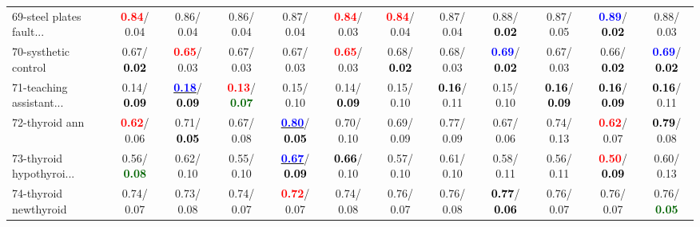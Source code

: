 \begin{table}[h]
\begin{center}
{\begin{tabular}{lc|c|c|c|c|c|c|c|c|c|c}
69-steel plates fault... & \textcolor{red}{\textbf{  0.84}}/  0.04 &   0.86/  0.04 &   0.86/  0.04 &   0.87/  0.04 & \textcolor{red}{\textbf{  0.84}}/  0.03 & \textcolor{red}{\textbf{  0.84}}/  0.04 &   0.87/  0.04 &   0.88/\textcolor{black}{\textbf{  0.02}} &   0.87/  0.05 & \textcolor{blue}{\textbf{  0.89}}/\textcolor{black}{\textbf{  0.02}} &   0.88/  0.03 \\
70-systhetic control &   0.67/\textcolor{black}{\textbf{  0.02}} & \textcolor{red}{\textbf{  0.65}}/  0.03 &   0.67/  0.03 &   0.67/  0.03 & \textcolor{red}{\textbf{  0.65}}/  0.03 &   0.68/\textcolor{black}{\textbf{  0.02}} &   0.68/  0.03 & \textcolor{blue}{\textbf{  0.69}}/\textcolor{black}{\textbf{  0.02}} &   0.67/  0.03 &   0.66/\textcolor{black}{\textbf{  0.02}} & \textcolor{blue}{\textbf{  0.69}}/\textcolor{black}{\textbf{  0.02}} \\
71-teaching assistant... &   0.14/\textcolor{black}{\textbf{  0.09}} & \underline{\textcolor{blue}{\textbf{  0.18}}}/\textcolor{black}{\textbf{  0.09}} & \textcolor{red}{\textbf{  0.13}}/\textcolor{darkgreen}{\textbf{  0.07}} &   0.15/  0.10 &   0.14/\textcolor{black}{\textbf{  0.09}} &   0.15/  0.10 & \textcolor{black}{\textbf{  0.16}}/  0.11 &   0.15/  0.10 & \textcolor{black}{\textbf{  0.16}}/\textcolor{black}{\textbf{  0.09}} & \textcolor{black}{\textbf{  0.16}}/\textcolor{black}{\textbf{  0.09}} & \textcolor{black}{\textbf{  0.16}}/  0.11 \\ \hline
72-thyroid ann & \textcolor{red}{\textbf{  0.62}}/  0.06 &   0.71/\textcolor{black}{\textbf{  0.05}} &   0.67/  0.08 & \underline{\textcolor{blue}{\textbf{  0.80}}}/\textcolor{black}{\textbf{  0.05}} &   0.70/  0.10 &   0.69/  0.09 &   0.77/  0.09 &   0.67/  0.06 &   0.74/  0.13 & \textcolor{red}{\textbf{  0.62}}/  0.07 & \textcolor{black}{\textbf{  0.79}}/  0.08 \\
73-thyroid hypothyroi... &   0.56/\textcolor{darkgreen}{\textbf{  0.08}} &   0.62/  0.10 &   0.55/  0.10 & \underline{\textcolor{blue}{\textbf{  0.67}}}/\textcolor{black}{\textbf{  0.09}} & \textcolor{black}{\textbf{  0.66}}/  0.10 &   0.57/  0.10 &   0.61/  0.10 &   0.58/  0.11 &   0.56/  0.11 & \textcolor{red}{\textbf{  0.50}}/\textcolor{black}{\textbf{  0.09}} &   0.60/  0.13 \\
74-thyroid newthyroid &   0.74/  0.07 &   0.73/  0.08 &   0.74/  0.07 & \textcolor{red}{\textbf{  0.72}}/  0.07 &   0.74/  0.08 &   0.76/  0.07 &   0.76/  0.08 & \textcolor{black}{\textbf{  0.77}}/\textcolor{black}{\textbf{  0.06}} &   0.76/  0.07 &   0.76/  0.07 &   0.76/\textcolor{darkgreen}{\textbf{  0.05}} \\

\end{tabular}}
\end{center}
\end{table}
